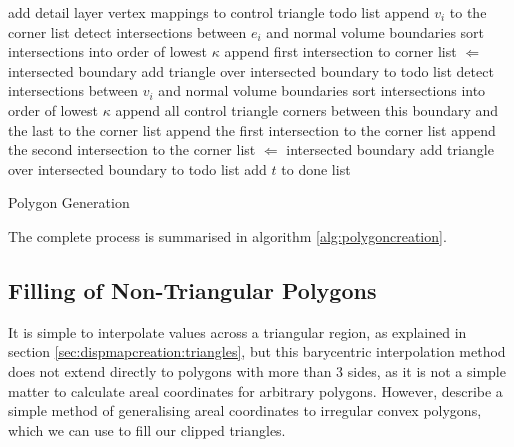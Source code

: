 \begin{algorithm}[tbp]
\begin{algorithmic}
\STATE add detail layer vertex mappings to control triangle todo list
			\STATE append $v_i$ to the corner list
				\STATE detect intersections between $e_i$ and normal volume boundaries
				\STATE sort intersections into order of lowest $\kappa$
				\STATE append first intersection to corner list
				 $\Leftarrow$ intersected boundary
					\STATE add triangle over intersected boundary to todo list
				\ENDIF
			\ENDIF
		\ELSE
			\STATE detect intersections between $v_i$ and normal volume boundaries
				\STATE sort intersections into order of lowest $\kappa$
					\STATE append all control triangle corners between this boundary and the last to the corner list
				\ENDIF
				\STATE append the first intersection to the corner list
					\STATE append the second intersection to the corner list
					 $\Leftarrow$ intersected boundary
						\STATE add triangle over intersected boundary to todo list
					\ENDIF
				\ENDIF
			\ENDIF
		\ENDIF
	\ENDFOR
	\STATE add $t$ to done list
\ENDFOR
\end{algorithmic}
\caption{\label{alg:polygoncreation}Polygon Generation}
\end{algorithm}

The complete process is summarised in algorithm \ref{alg:polygoncreation}.

\subsection{\label{sec:dispmapcreation:edges:filling}Filling of Non-Triangular Polygons}

It is simple to interpolate values across a triangular region, as explained in section \ref{sec:dispmapcreation:triangles}, but this barycentric interpolation method does not extend directly to polygons with more than 3 sides, as it is not a simple matter to calculate areal coordinates for arbitrary polygons. However, \citet{Meyer02} describe a simple method of generalising areal coordinates to irregular convex polygons, which we can use to fill our clipped triangles. 

